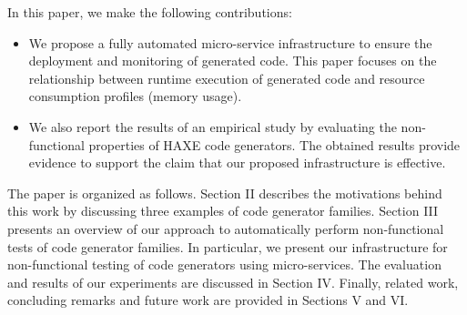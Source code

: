 In this paper, we make the following contributions:
\begin{itemize} 	
	
	\item We propose a fully automated micro-service infrastructure to ensure the deployment and monitoring of generated code. This paper focuses on the relationship between runtime execution of generated code and resource consumption profiles (memory usage).
	\item We also report the results of an empirical study by evaluating the non-functional properties of HAXE code generators. The obtained results provide evidence to support the claim that our proposed infrastructure is effective.	
\end{itemize}

The paper is organized as follows.
Section II describes the motivations behind this work by discussing three examples of code generator families. Section III presents an overview of our approach to automatically perform non-functional tests of code generator families. In particular, we present our infrastructure for non-functional testing of code generators using micro-services. 
The evaluation and results of our experiments are discussed in Section IV. 
Finally, related work, concluding remarks and future work are provided in Sections V and VI.

